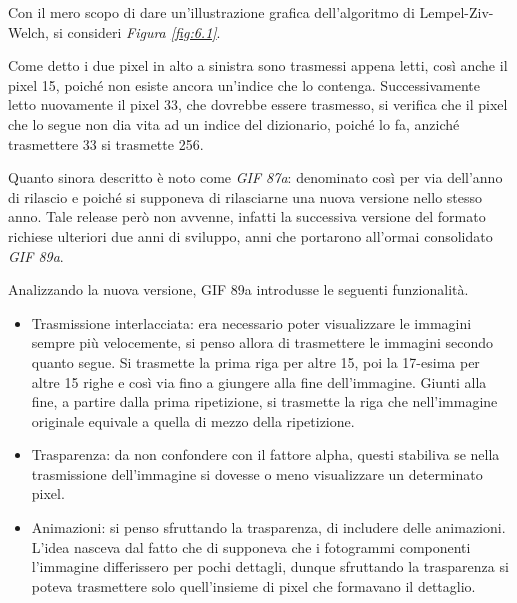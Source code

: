 \documentclass{subfiles}
\begin{document}
\begin{Example*}
    Con il mero scopo di dare un'illustrazione grafica dell'algoritmo di Lempel-Ziv-Welch, si consideri \emph{Figura \ref{fig:6.1}}.
    

    Come detto i due pixel in alto a sinistra sono trasmessi appena letti, così anche il pixel 15, poiché non esiste ancora un'indice che lo contenga.
    Successivamente letto nuovamente il pixel 33, che dovrebbe essere trasmesso, si verifica che il pixel che lo segue non dia vita ad un indice del dizionario,
    poiché lo fa, anziché trasmettere 33 si trasmette 256.
\end{Example*}

Quanto sinora descritto è noto come \emph{GIF 87a}: denominato così per via dell'anno di rilascio e poiché si supponeva di rilasciarne una nuova versione nello stesso anno.
Tale release però non avvenne, infatti la successiva versione del formato richiese ulteriori due anni di sviluppo, anni che portarono all'ormai consolidato \emph{GIF 89a}.

Analizzando la nuova versione, GIF 89a introdusse le seguenti funzionalità.
\begin{itemize}
    \item Trasmissione interlacciata: era necessario poter visualizzare le immagini sempre più velocemente, si penso allora di trasmettere le immagini secondo quanto segue.
          Si trasmette la prima riga per altre 15, poi la 17-esima per altre 15 righe e così via fino a giungere alla fine dell'immagine.
          Giunti alla fine, a partire dalla prima ripetizione, si trasmette la riga che nell'immagine originale equivale a quella di mezzo della ripetizione.

    \item Trasparenza: da non confondere con il fattore alpha, questi stabiliva se nella trasmissione dell'immagine si dovesse o meno visualizzare un determinato pixel.
    \item Animazioni: si penso sfruttando la trasparenza, di includere delle animazioni.
          L'idea nasceva dal fatto che di supponeva che i fotogrammi componenti l'immagine differissero per pochi dettagli,
          dunque sfruttando la trasparenza si poteva trasmettere solo quell'insieme di pixel che formavano il dettaglio.
\end{itemize}
\clearpage
\end{document}
